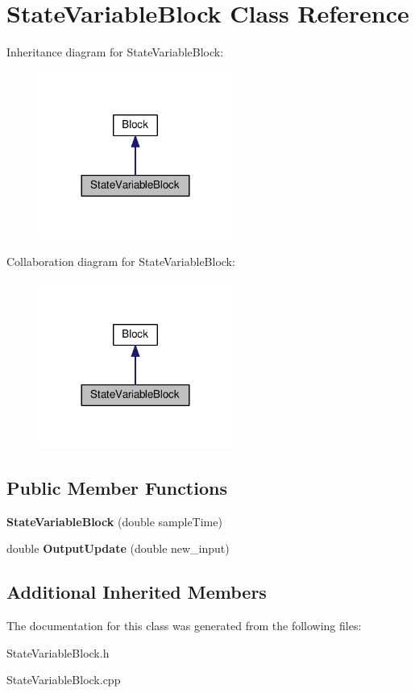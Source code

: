 \hypertarget{classStateVariableBlock}{}\section{State\+Variable\+Block Class Reference}
\label{classStateVariableBlock}


Inheritance diagram for State\+Variable\+Block\+:
\nopagebreak
\begin{figure}[H]
\begin{center}
\leavevmode
\includegraphics[width=180pt]{classStateVariableBlock__inherit__graph}
\end{center}
\end{figure}


Collaboration diagram for State\+Variable\+Block\+:
\nopagebreak
\begin{figure}[H]
\begin{center}
\leavevmode
\includegraphics[width=180pt]{classStateVariableBlock__coll__graph}
\end{center}
\end{figure}
\subsection*{Public Member Functions}
\begin{DoxyCompactItemize}
\item 
\mbox{\label{classStateVariableBlock_a11e0cfeb7ab94b63a8a5d82d5d41cfc9}} 
{\bfseries State\+Variable\+Block} (double sample\+Time)
\item 
\mbox{\label{classStateVariableBlock_a29725438c8df4b7a4ae6822797977a36}} 
double {\bfseries Output\+Update} (double new\+\_\+input)
\end{DoxyCompactItemize}
\subsection*{Additional Inherited Members}


The documentation for this class was generated from the following files\+:\begin{DoxyCompactItemize}
\item 
State\+Variable\+Block.\+h\item 
State\+Variable\+Block.\+cpp\end{DoxyCompactItemize}
